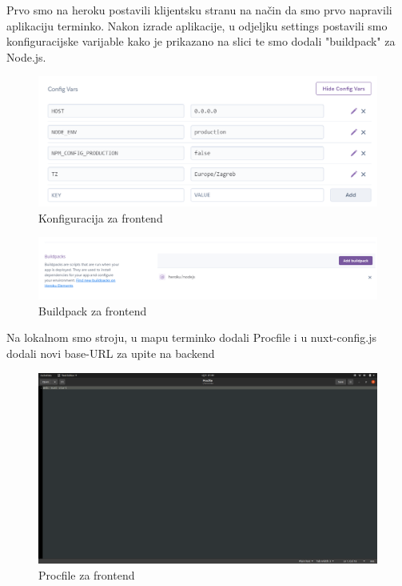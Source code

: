 			Prvo smo na heroku postavili klijentsku stranu na način da smo prvo napravili aplikaciju terminko. Nakon izrade aplikacije, u odjeljku settings postavili smo konfiguracijske varijable kako je prikazano na slici te smo dodali "buildpack" za Node.js.
			
			\begin{figure}[H]
				\centering
				\includegraphics[scale=0.65]{slike/KonfiguracijaFrontend.PNG}
				\caption{Konfiguracija za frontend}
				\label{fig:promjene}
			\end{figure}
		
			\begin{figure}[H]
				\centering
				\includegraphics[scale=0.45]{slike/BuildpackFrontend.PNG}
				\caption{Buildpack za frontend}
				\label{fig:promjene}
			\end{figure}
		
			Na lokalnom smo stroju, u mapu terminko dodali Procfile i u nuxt-config.js dodali novi base-URL za upite na backend
			
			\begin{figure}[H]
				\centering
				\includegraphics[scale=0.25]{slike/ProcFileFrontend.PNG}
				\caption{Procfile za frontend}
				\label{fig:promjene}
			\end{figure}
			
